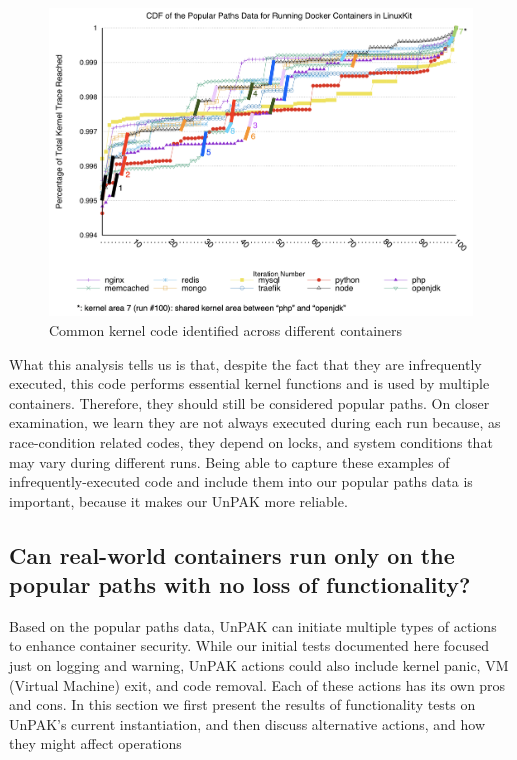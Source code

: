 \begin{figure}
\centering
\includegraphics[width=1.5\columnwidth]{diagram/cdf-marked.png}
\caption{\small Common kernel code identified across different containers}
\label{fig:cdf-marked}
\end{figure}

What this analysis tells us is that, despite the fact that they are infrequently executed, this code performs essential kernel functions and is used by multiple containers. 
Therefore, they should still be considered popular paths. On closer examination, we learn they are not always executed during each run because, as race-condition related codes, 
they depend on locks, and system conditions that may vary during different runs. 
Being able to capture these examples of infrequently-executed code and include them into our popular paths data is important, because it makes our UnPAK more reliable. 

\subsection{Can real-world containers run only on the popular paths with no loss of functionality?}
\label{sec.evaluation.3} 
Based on the popular paths data,  UnPAK can initiate multiple types of actions to enhance container security. 
While our initial tests documented here focused just on logging and warning, UnPAK actions could also include kernel panic, VM (Virtual Machine) exit, and code removal.  
Each of these actions has its own pros and cons. In this section we first present the results of functionality tests on UnPAK’s current instantiation, 
and then discuss alternative actions, and how they might affect operations

